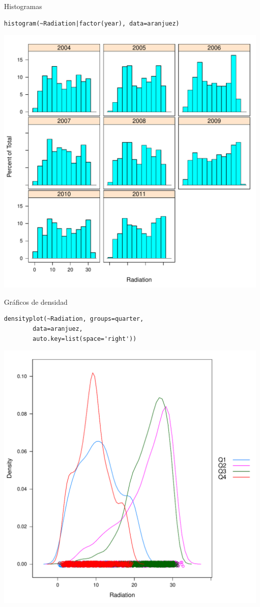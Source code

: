 \documentclass[xcolor={usenames,svgnames,dvipsnames}]{beamer}
\begin{document}
\begin{frame}[fragile,label=sec-2-1-22]{Histogramas}
 \lstset{language=R,numbers=none}
\begin{lstlisting}
histogram(~Radiation|factor(year), data=aranjuez)
\end{lstlisting}

\includegraphics[width=.9\linewidth]{figs/histogram.pdf}
\end{frame}
\begin{frame}[fragile,label=sec-2-1-23]{Gráficos de densidad}
 \lstset{language=R,numbers=none}
\begin{lstlisting}
densityplot(~Radiation, groups=quarter,
	    data=aranjuez,
	    auto.key=list(space='right'))
\end{lstlisting}

\includegraphics[width=.9\linewidth]{figs/density.pdf}
\end{frame}
\end{document}

